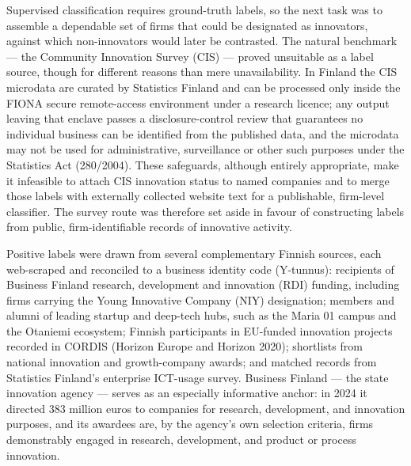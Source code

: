 \documentclass[runningheads]{llncs}
\begin{document}
Supervised classification requires ground-truth labels, so the next task was to assemble a dependable set of firms that could be designated as innovators, against which non-innovators would later be contrasted. The natural benchmark — the Community Innovation Survey (CIS) — proved unsuitable as a label source, though for different reasons than mere unavailability. In Finland the CIS microdata are curated by Statistics Finland and can be processed only inside the FIONA secure remote-access environment under a research licence; any output leaving that enclave passes a disclosure-control review that guarantees no individual business can be identified from the published data, and the microdata may not be used for administrative, surveillance or other such purposes under the Statistics Act (280/2004). These safeguards, although entirely appropriate, make it infeasible to attach CIS innovation status to named companies and to merge those labels with externally collected website text for a publishable, firm-level classifier. The survey route was therefore set aside in favour of constructing labels from public, firm-identifiable records of innovative activity. 

Positive labels were drawn from several complementary Finnish sources, each web-scraped and reconciled to a business identity code (Y-tunnus): recipients of Business Finland research, development and innovation (RDI) funding, including firms carrying the Young Innovative Company (NIY) designation; members and alumni of leading startup and deep-tech hubs, such as the Maria 01 campus and the Otaniemi ecosystem; Finnish participants in EU-funded innovation projects recorded in CORDIS (Horizon Europe and Horizon 2020); shortlists from national innovation and growth-company awards; and matched records from Statistics Finland's enterprise ICT-usage survey. Business Finland — the state innovation agency — serves as an especially informative anchor: in 2024 it directed 383 million euros to companies for research, development, and innovation purposes, and its awardees are, by the agency's own selection criteria, firms demonstrably engaged in research, development, and product or process innovation.
\end{document}
